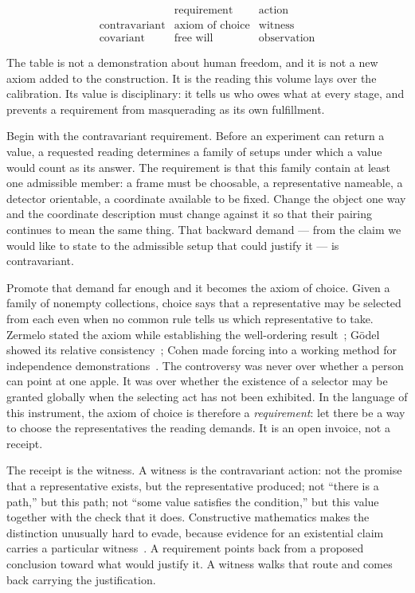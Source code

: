 \documentclass[12pt,oneside]{book}
\begin{document}
\[
\begin{array}{c|cc}
 & \text{requirement} & \text{action} \\
\hline
\text{contravariant} & \text{axiom of choice} & \text{witness} \\
\text{covariant}     & \text{free will}       & \text{observation}
\end{array}
\]

The table is not a demonstration about human freedom, and it is not a new axiom added to the construction. It is the reading this
volume lays over the calibration. Its value is disciplinary: it tells us who owes what at every stage, and prevents a
requirement from masquerading as its own fulfillment.

Begin with the contravariant requirement. Before an experiment can return a value, a requested reading determines a
family of setups under which a value would count as its answer. The requirement is that this family contain at least one
admissible member: a frame must be choosable, a representative nameable, a detector orientable, a coordinate available
to be fixed. Change the object one way and the coordinate description must change against it so that their pairing
continues to mean the same thing. That backward demand --- from the claim we would like to state to the admissible setup
that could justify it --- is contravariant.

Promote that demand far enough and it becomes the axiom of choice. Given a family of nonempty collections, choice says
that a representative may be selected from each even when no common rule tells us which representative to take.
Zermelo stated the axiom while establishing the well-ordering result~\cite{zermelo1904}; G\"odel showed its
relative consistency~\cite{godel1938}; Cohen made forcing into a working method for
independence demonstrations~\cite{cohen1963}. The controversy was never over whether a person can point at one apple. It was over whether
the existence of a selector may be granted globally when the selecting act has not been exhibited. In the language of
this instrument, the axiom of choice is therefore a \emph{requirement}: let there be a way to choose the representatives
the reading demands. It is an open invoice, not a receipt.

The receipt is the witness. A witness is the contravariant action: not the promise that a representative exists, but
the representative produced; not ``there is a path,'' but this path; not ``some value satisfies the condition,'' but
this value together with the check that it does. Constructive mathematics makes the distinction unusually hard to
evade, because evidence for an existential claim carries a particular witness~\cite{martinlof1984}. A requirement points
back from a proposed conclusion toward what would justify it. A witness walks that route and comes back carrying the
justification.
\end{document}
